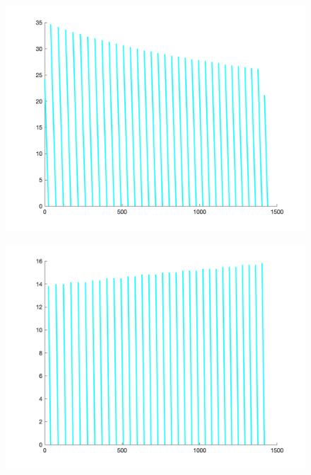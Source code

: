 \documentclass[withoutpreface,bwprint]{cumcmthesis} %
\begin{document}
\begin{figure}[H]
\begin{minipage}[c]{0.35\textwidth}
        \includegraphics[width=1\textwidth]{figures/2-2-20-up.png}
    \label{fig:my_label}
    \end{minipage}
\begin{minipage}[c]{0.35\textwidth}
    \includegraphics[width=1\textwidth]{figures/2-2-20-down.png}
    \label{fig:my_label}
\end{minipage}
\end{figure}
\end{document}
